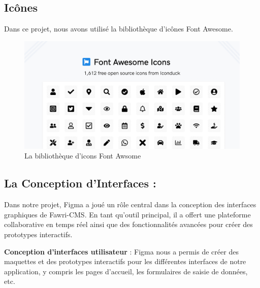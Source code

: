 \subsection{Icônes}
\hspace{\parindent}Dans ce projet, nous avons utilisé la bibliothèque d'icônes Font Awesome.
\\
\begin{figure}[H]
  \centering
  \includegraphics[width=15cm]{Figures/icons.PNG}
  \caption{La bibliothèque d'icons Font Awsome}
\end{figure}











\subsection{La Conception d'Interfaces :}

\hspace{\parindent}Dans notre projet, Figma a joué un rôle central dans la conception des interfaces graphiques de Fawri-CMS. En tant qu'outil principal, il a offert une plateforme collaborative en temps réel ainsi que des fonctionnalités avancées pour créer des prototypes interactifs.

\textbf{Conception d'interfaces utilisateur} : Figma nous a permis de créer des maquettes et des prototypes interactifs pour les différentes interfaces de notre application, y compris les pages d'accueil, les formulaires de saisie de données, etc.

